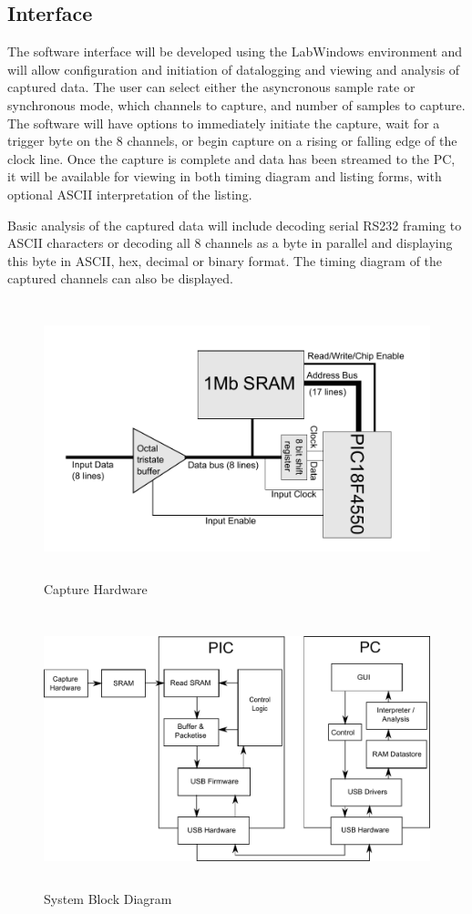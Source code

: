 \documentclass[11pt]{article}
\begin{document}
\subsection{Interface}
    The software interface will be developed using the LabWindows environment and will allow configuration and initiation of datalogging and viewing and analysis of captured data.  The user can select either the asyncronous sample rate or synchronous mode, which channels to capture, and number of samples to capture.  The software will have options to immediately initiate the capture, wait for a trigger byte on the 8 channels, or begin capture on a rising or falling edge of the clock line.  Once the capture is complete and data has been streamed to the PC, it will be available for viewing in both timing diagram and listing forms, with optional ASCII interpretation of the listing.



    Basic analysis of the captured data will include decoding serial RS232 framing
    to ASCII characters or decoding all 8 channels as a byte in parallel and
    displaying this byte in ASCII, hex, decimal or binary format.  The timing
    diagram of the captured channels can also be displayed.
    
    \begin{figure}
    \centering
    \includegraphics[height=8cm]{hardware.pdf}
    \caption{Capture Hardware}
    \label{fig:app}
    \end{figure}

    \begin{figure}
    \centering
    \includegraphics[height=8cm]{block-diagram.pdf}
    \caption{System Block Diagram}
    \label{fig:app}
    \end{figure}
\end{document}
